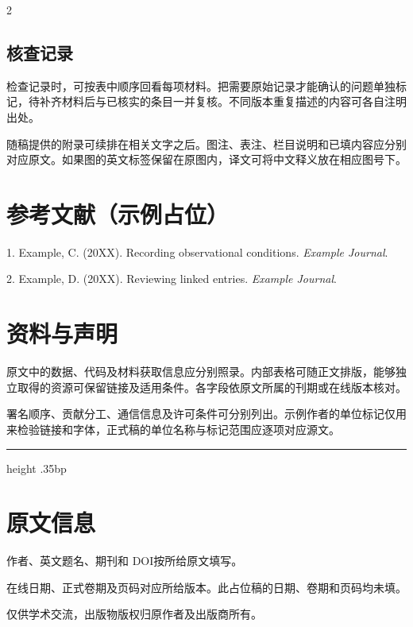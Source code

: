 \begin{multicols}{2}
\subsection*{核查记录}
检查记录时，可按表中顺序回看每项材料。把需要原始记录才能确认的问题单独标记，待补齐材料后与已核实的条目一并复核。不同版本重复描述的内容可各自注明出处。

随稿提供的附录可续排在相关文字之后。图注、表注、栏目说明和已填内容应分别对应原文。如果图的英文标签保留在原图内，译文可将中文释义放在相应图号下。

\section*{参考文献（示例占位）}
{\small\noindent\hypertarget{ncv-article:ref:1}{}1. Example, C. (20XX). Recording observational conditions. \emph{Example Journal}.\par
\noindent\hypertarget{ncv-article:ref:2}{}2. Example, D. (20XX). Reviewing linked entries. \emph{Example Journal}.\par}

\section*{资料与声明}
原文中的数据、代码及材料获取信息应分别照录。内部表格可随正文排版，能够独立取得的资源可保留链接及适用条件。各字段依原文所属的刊期或在线版本核对。

署名顺序、贡献分工、通信信息及许可条件可分别列出。示例作者的单位标记仅用来检验链接和字体，正式稿的单位名称与标记范围应逐项对应源文。
\end{multicols}

\medskip\hrule height .35bp\vspace{4bp}

\section*{原文信息}
\noindent 作者、英文题名、期刊和 DOI\enspace 按所给原文填写。\par
\noindent 在线日期、正式卷期及页码\enspace 对应所给版本。此占位稿的日期、卷期和页码均未填。\par
\medskip\noindent 仅供学术交流，出版物版权归原作者及出版商所有。\par
\clearpage
\endgroup
